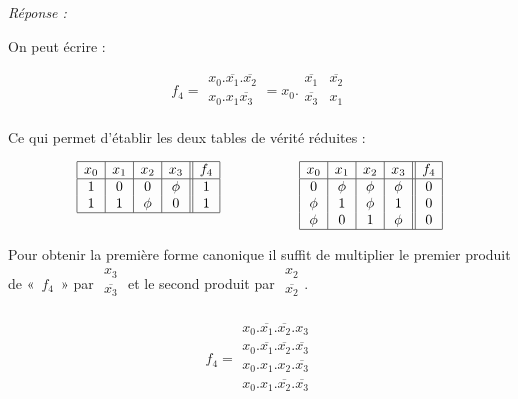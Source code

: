 \begin{enumerate} [label=\arabic*$^\circ$]
 \textsl{Réponse :}
 
 On peut écrire : 
 \medskip
  
  \[ f_4 = 
  \begin{array}{|c|}   
       x_0 . \overline{x_1} . \overline{x_2}  \\
       x_0 . x_1 \overline{x_3} \\
   \end{array}  = x_0 . \begin{array}{|c|c|} 
   							\overline{x_1} & \overline{x_2} \\
   							\overline{x_3} & x_1 \\
                        \end{array} 
  \]
  
  \medskip  
 
 Ce qui permet d'établir les deux tables de vérité réduites : 
 
 
\[
\begin{array}{|c|c|c|c||c|}
\hline 
x_0 & x_1 &  x_2 & x_3 &   f_4 \\
\hline 
1 & 0 & 0 & \phi & 1 \\
1 & 1 & \phi & 0 & 1 \\
\hline 
\multicolumn{5}{c}{} \\
\end{array} \hspace*{2 cm}
    \begin{array}{|c|c|c|c||c|}
	\hline 
	x_0 & x_1 &  x_2 & x_3 &   f_4 \\
	\hline 
	0  &  \phi &   \phi &  \phi & 0 \\
	\phi & 1  & \phi & 1 &  0 \\
		\phi& 0  & 1  & \phi &  0 \\
	\hline 
	\end{array} 
\] 

Pour obtenir la première forme canonique il suffit de multiplier le premier produit de «~$f_4$~» par
 $\begin{array}{|c|}
x_3  \\
\overline{x_3} \\  \end{array} $ et le second produit par  $\begin{array}{|c|}
x_2  \\
\overline{x_2} \\  \end{array}$.  

\bigskip 

\[ f_4 = 
\begin{array}{|c|} 
     x_0 . \overline{x_1} . \overline{x_2} . x_3 \\
     x_0 . \overline{x_1} . \overline{x_2} . \overline{x_3} \\
     x_0 . x_1 . x_2 . \overline{x_3} \\
     x_0 . x_1 . \overline{x_2}  . \overline{x_3} \\     
\end{array}
\]


\end{enumerate}
